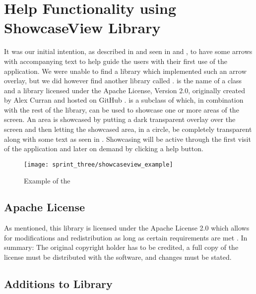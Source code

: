 
\section{Help Functionality using ShowcaseView Library}
\label{sec:help_functionality_using_showcaseview_library}

It was our initial intention, as described in  and seen in  and , to have some arrows with accompanying text to help guide the users with their first use of the application. We were unable to find a library which implemented such an arrow overlay, but we did however find another library called .  is the name of a class and a library licensed under the Apache License, Version 2.0, originally created by Alex Curran and hosted on GitHub \parencite{showcaseview_by_alex_curran}.  is a subclass of  which, in combination with the rest of the library, can be used to showcase one or more areas of the screen. An area is showcased by putting a dark transparent overlay over the screen and then letting the showcased area, in a circle, be completely transparent along with some text as seen in . Showcasing will be active through the first visit of the application and later on demand by clicking a help button. \\

\begin{figure}[!htbp]
    \centering
    \texttt{[image: sprint\_three/showcaseview\_example]}
    \caption{Example of the }
    \label{fig:showcaseview_example}
\end{figure}

\subsection{Apache License}
As mentioned, this library is licensed under the Apache License 2.0 which allows for modifications and redistribution as long as certain requirements are met \parencite{apache2license}. In summary: The original copyright holder has to be credited, a full copy of the license must be distributed with the software, and changes must be stated.

\subsection{Additions to Library}

